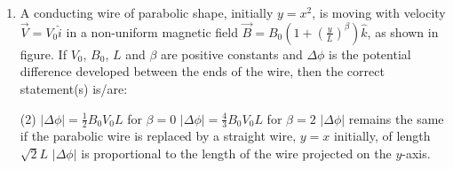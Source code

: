
\begin{enumerate}
    \item A conducting wire of parabolic shape, initially \( y = x^2 \), is moving with velocity \( \vec{V} = V_0 \hat{i} \) in a non-uniform magnetic field \( \vec{B} = B_0 \left( 1 + \left( \frac{y}{L} \right)^\beta \right) \hat{k} \), as shown in figure. If \( V_0 \), \( B_0 \), \( L \) and \( \beta \) are positive constants and \( \Delta \phi \) is the potential difference developed between the ends of the wire, then the correct statement(s) is/are:
        \begin{tasks}(2)
            	\task \( |\Delta \phi| = \frac{1}{2} B_0 V_0 L \) for \( \beta = 0 \)
            	\task \( |\Delta \phi| = \frac{4}{3} B_0 V_0 L \) for \( \beta = 2 \)
            	\task \( |\Delta \phi| \) remains the same if the parabolic wire is replaced by a straight wire, \( y = x \) initially, of length \( \sqrt{2}L \)
            	\task \( |\Delta \phi| \) is proportional to the length of the wire projected on the \( y \)-axis.
        \end{tasks}
\end{enumerate}
\begin{center}
\end{center}
